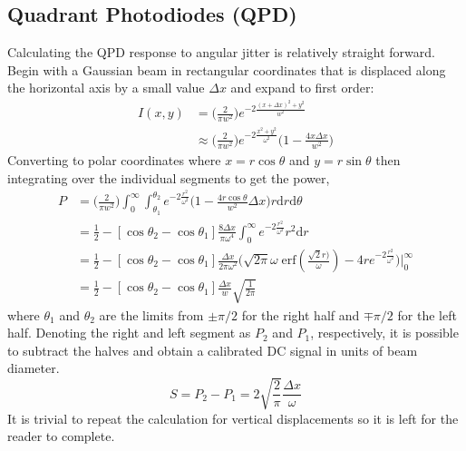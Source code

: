 \begin{appendices}
	\section{Quadrant Photodiodes (QPD)}
	Calculating the QPD response to angular jitter is relatively straight forward. Begin with a Gaussian beam in rectangular coordinates that is displaced along the horizontal axis by a small value $\Delta x$ and expand to first order:
	\begin{equation}
	\begin{split}\label{gauss_intensity_yaw}
	I(x,y) 	&= 			\bigg(\frac{2}{\pi w^2}\bigg) e^{-2 \frac{(x+\Delta x)^2 + y^2}{w^2}}\\
			&\approx	\bigg(\frac{2}{\pi w^2}\bigg) e^{-2 \frac{x^2 + y^2}{\omega^2}}  \bigg(1-\frac{4 x \Delta x}{w^2}\bigg)
	\end{split}
	\end{equation}
	Converting to polar coordinates where $x=r\cos \theta$ and $y=r \sin \theta$ then integrating over the individual segments to get the power,
	\begin{equation}
	\begin{split}
	P 	&=  \bigg(\frac{2}{\pi w^2}\bigg) \int_{0}^{\infty} \int_{\theta_1}^{\theta_2} e^{-2 \frac{r^2}{\omega^2}}  \bigg(1-\frac{4 r \cos \theta}{w^2}\Delta x\bigg) r \text{d}r \text{d} \theta\\
		&= \frac{1}{2} - [\cos \theta_2 - \cos \theta_1] \frac{8 \Delta x }{\pi \omega^4}\int_{0}^{\infty} e^{-2\frac{r^2}{\omega^2}} r^2 \text{d}r\\
		&= \frac{1}{2} - [\cos \theta_2 - \cos \theta_1] \frac{\Delta x }{2\pi \omega^2} \bigg(\sqrt{2\pi} \omega \; \text{erf}(\frac{\sqrt{2}r)}{\omega}) - 4 r e^{-2 \frac{r^2}{\omega^2}} \bigg) \bigg\vert^\infty_0\\
		&= \frac{1}{2} - [\cos \theta_2 - \cos \theta_1] \frac{\Delta x}{w} \sqrt{\frac{1}{2\pi}}
	\end{split}
	\end{equation}
	where $\theta_1$ and $\theta_2$ are the limits from $\pm \pi/2$ for the right half and $\mp \pi/2$ for the left half.  Denoting the right and left segment as $P_2$ and $P_1$, respectively, it is possible to subtract the halves and obtain a calibrated DC signal in units of beam diameter.
	\begin{equation}
	S = P_2 - P_1 = 2\sqrt{\frac{2}{\pi}} \frac{\Delta x}{\omega}
	\end{equation}
	It is trivial to repeat the calculation for vertical displacements so it is left for the reader to complete.
	

\end{appendices}
